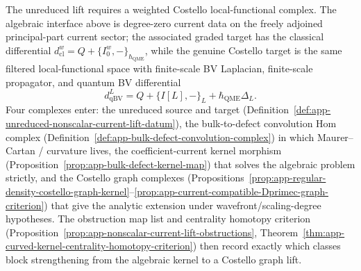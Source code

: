 \medskip
The unreduced lift requires a weighted Costello local-functional
complex.  The
algebraic interface above is degree-zero current data on the freely
adjoined principal-part current sector; the associated graded target has
the classical differential
\(d_{\mathrm{cl}}^w=Q+\{I_0^w,-\}_{\hbar_{\mathrm{QME}}}\), while the genuine Costello
target is the same filtered local-functional space with finite-scale BV
Laplacian, finite-scale propagator, and quantum BV differential
\[
  d_{\mathrm{qBV}}^L=Q+\{I[L],-\}_L+\hbar_{\mathrm{QME}}\Delta_L .
\]
Four complexes enter: the unreduced source
and target (Definition~\ref{def:app-unreduced-nonscalar-current-lift-datum}),
the bulk-to-defect convolution Hom complex
(Definition~\ref{def:app-bulk-defect-convolution-complex}) in which
Maurer--Cartan / curvature lives, the coefficient-current kernel morphism
(Proposition~\ref{prop:app-bulk-defect-kernel-map}) that solves the
algebraic problem strictly, and the Costello graph complexes
(Propositions~\ref{prop:app-regular-density-costello-graph-kernel}--\ref{prop:app-current-compatible-Dprimec-graph-criterion})
that give the analytic extension under wavefront/scaling-degree
hypotheses.  The obstruction map list and centrality homotopy
criterion (Proposition~\ref{prop:app-nonscalar-current-lift-obstructions},
Theorem~\ref{thm:app-curved-kernel-centrality-homotopy-criterion}) then
record exactly which classes block strengthening from the algebraic
kernel to a Costello graph lift.

